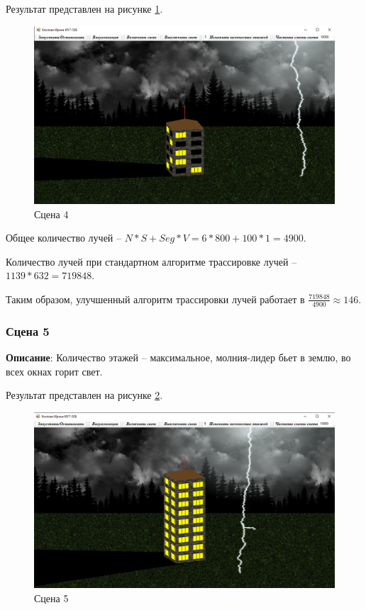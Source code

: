 Результат представлен на рисунке \ref{img:s4}.
\begin{figure}[H]
	\begin{center}
		\includegraphics[scale=0.40]{img/prog_res/s4.png}
	\end{center}
	\captionsetup{justification=centering}
	\caption{Сцена 4}
	\label{img:s4}
\end{figure}

Общее количество лучей -- $ N * S + Seg * V = 6 * 800 + 100 * 1 = 4 900$.

Количество лучей при стандартном алгоритме трассировке лучей -- $1139 * 632 = 719 848$. 

Таким образом, улучшенный алгоритм трассировки лучей работает в $\frac{719 848}{4 900} \approx 146$. 

\subsubsection{Сцена 5}
\textbf{Описание}: Количество этажей -- максимальное, молния-лидер бьет в землю, во всех окнах горит свет.

Результат представлен на рисунке \ref{img:s5}.
\begin{figure}[H]
	\begin{center}
		\includegraphics[scale=0.40]{img/prog_res/s5.png}
	\end{center}
	\captionsetup{justification=centering}
	\caption{Сцена 5}
	\label{img:s5}
\end{figure}

